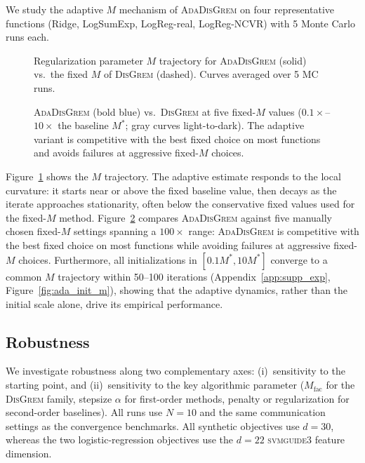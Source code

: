 \documentclass[review,onefignum,onetabnum]{siamart171218}
\begin{document}
	We study the adaptive $M$ mechanism of \textsc{AdaDisGrem} on four
	representative functions (Ridge, LogSumExp, LogReg-real, LogReg-NCVR)
	with 5 Monte Carlo runs each.
	
	\begin{figure}[htbp]
		\centering
		\caption{Regularization parameter $M$ trajectory for \textsc{AdaDisGrem}
			(solid) vs.\ the fixed $M$ of \textsc{DisGrem} (dashed).
			Curves averaged over 5 MC runs.}
		\label{fig:ada_trajectory}
	\end{figure}
	
	\begin{figure}[htbp]
		\centering
		\caption{\textsc{AdaDisGrem} (bold blue) vs.\ \textsc{DisGrem}
			at five fixed-$M$ values
			($0.1\times$--$10\times$ the baseline $M^*$; gray curves
			light-to-dark).
			The adaptive variant is competitive with the best fixed
			choice on most functions and avoids failures at aggressive
			fixed-$M$ choices.}
		\label{fig:ada_vs_fixed}
	\end{figure}
	
	Figure~\ref{fig:ada_trajectory} shows the $M$ trajectory.
	The adaptive estimate responds to the local curvature: it starts near
	or above the fixed baseline value, then decays as the iterate approaches
	stationarity, often below the conservative fixed values used for the
	fixed-$M$ method.
	Figure~\ref{fig:ada_vs_fixed} compares \textsc{AdaDisGrem} against
	five manually chosen fixed-$M$ settings spanning a $100\times$ range:
	\textsc{AdaDisGrem} is competitive with the best fixed choice on
	most functions while avoiding failures at aggressive fixed-$M$ choices.
	Furthermore, all initializations in $[0.1M^*,10M^*]$
	converge to a common $M$ trajectory within 50--100 iterations
	(Appendix~\ref{app:supp_exp}, Figure~\ref{fig:ada_init_m}),
	showing that the adaptive dynamics, rather than the initial scale alone,
	drive its empirical performance.
	
	\FloatBarrier
	\subsection{Robustness}\label{ssec:robust}
	
	We investigate robustness along two complementary axes:
	(i)~sensitivity to the starting point, and
	(ii)~sensitivity to the key algorithmic parameter ($M_{\mathrm{fac}}$ for
	the \textsc{DisGrem} family, stepsize $\alpha$ for first-order methods,
	penalty or regularization for second-order baselines).
	All runs use $N{=}10$ and the same communication settings as the
	convergence benchmarks. All synthetic objectives use $d{=}30$,
	whereas the two logistic-regression objectives use the $d{=}22$
	\textsc{svmguide3} feature dimension.
	
\end{document}

